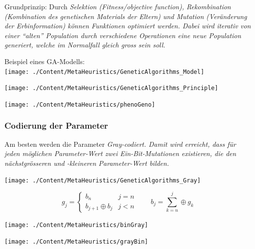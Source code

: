     Grundprinzip: Durch \em Selektion \em (Fitness/objective function), \em Rekombination \em (Kombination des genetischen Materials der Eltern) und \em Mutation \em (Veränderung der Erbinformation) können Funktionen optimiert werden. Dabei wird iterativ von einer "`alten"' Population durch verschiedene Operationen eine neue Population generiert, welche im Normalfall gleich gross sein soll.\\
    
  \begin{minipage}{12cm}  
    Beispiel eines GA-Modells:\\
    \texttt{[image: ./Content/MetaHeuristics/GeneticAlgorithms\_Model]}
  \end{minipage}
  \begin{minipage}{6cm}
    \begin{flushright}
      \texttt{[image: ./Content/MetaHeuristics/GeneticAlgorithms\_Principle]}
    \end{flushright}
  \end{minipage}
  
  \begin{center}
    \texttt{[image: ./Content/MetaHeuristics/phenoGeno]}
  \end{center}
  
    \subsubsection{Codierung der Parameter }
      Am besten werden die Parameter \em Gray\em -codiert. Damit wird erreicht, dass für jeden möglichen Parameter-Wert zwei Ein-Bit-Mutationen existieren, die den nächstgrösseren und -kleineren Parameter-Wert bilden.
      
      \begin{minipage}{0.33\textwidth}
      	\begin{center}
  	        \texttt{[image: ./Content/MetaHeuristics/GeneticAlgorithms\_Gray]}
  	      \end{center}
  	      $$g_j = \begin{cases}
  	        b_n                & j=n\\
  	        b_{j+1} \oplus b_j & j < n
  	        \end{cases} \qquad 
  	      b_j = \sum \limits_{k=n}^j \oplus g_k$$
      	\end{minipage}
      	\hfill
      	\begin{minipage}{0.3\textwidth}
            \texttt{[image: ./Content/MetaHeuristics/binGray]}	
    	\end{minipage}
    	\hfill
    	\begin{minipage}{0.3\textwidth}
            \texttt{[image: ./Content/MetaHeuristics/grayBin]}    	
    	\end{minipage}
  
